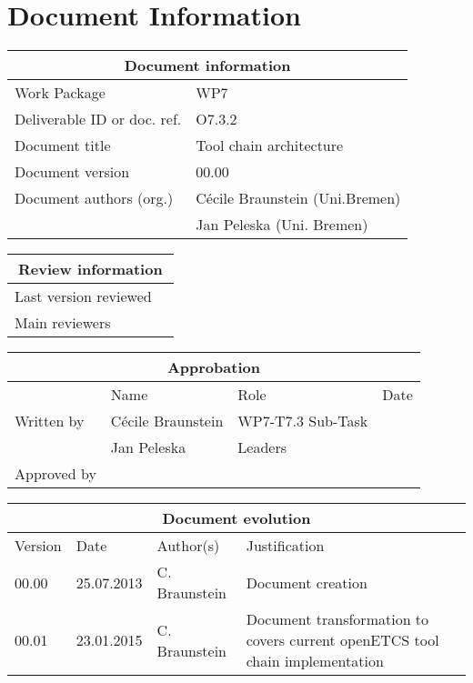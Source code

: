 \documentclass{template/openetcs_report}
\begin{document}
\chapter{Document Information}
\begin{tabular}{|p{4.4cm}|p{8.7cm}|}
\hline
\multicolumn{2}{|c|}{Document information} \\
\hline
Work Package &  WP7  \\
Deliverable ID or doc. ref. & O7.3.2\\
\hline
Document title & Tool chain architecture \\
Document version & 00.00 \\
Document authors (org.)  & Cécile Braunstein  (Uni.Bremen)  \\
& Jan Peleska (Uni. Bremen)\\
\hline
\end{tabular}

\begin{tabular}{|p{4.4cm}|p{8.7cm}|}
\hline
\multicolumn{2}{|c|}{Review information} \\
\hline
Last version reviewed &  \\
\hline
Main reviewers & \\
\hline
\end{tabular}

\begin{tabular}{|p{2.2cm}|p{4cm}|p{4cm}|p{2cm}|}
\hline
\multicolumn{4}{|c|}{Approbation} \\
\hline
  &  Name & Role & Date   \\
\hline  
Written by    &  Cécile Braunstein & WP7-T7.3 Sub-Task  & \\
& Jan Peleska & Leaders&\\
\hline
Approved by & &  & \\
\hline
\end{tabular}

\begin{tabular}{|p{2.2cm}|p{2cm}|p{3cm}|p{5cm}|}
\hline
\multicolumn{4}{|c|}{Document evolution} \\
\hline
Version &  Date & Author(s) & Justification  \\
\hline  
00.00 & 25.07.2013 & C. Braunstein  &  Document creation  \\
00.01 & 23.01.2015 & C. Braunstein & Document transformation to covers
current openETCS tool chain implementation\\ 
\hline  
\end{tabular}
\newpage
\end{document}

